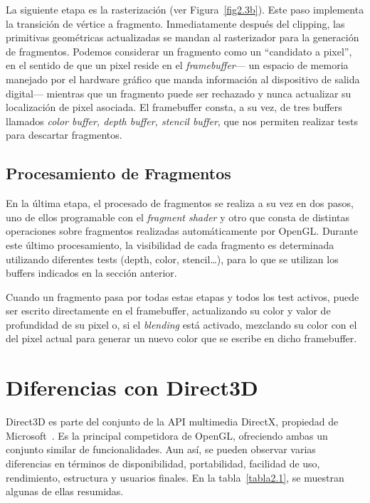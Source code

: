 La siguiente etapa es la rasterización (ver Figura~\ref{fig2.3b}). Este paso
implementa la transición de vértice a fragmento. Inmediatamente después del
clipping, las primitivas geométricas actualizadas se mandan al rasterizador para
la generación de fragmentos. Podemos considerar un fragmento como un ``candidato
a pixel'', en el sentido de que un pixel reside en el \textit{framebuffer}--- un
espacio de memoria manejado por el hardware gráfico que manda información al
dispositivo de salida digital--- mientras que un fragmento puede ser rechazado y
nunca actualizar su localización de pixel asociada. El framebuffer consta, a su
vez, de tres buffers llamados \textit{color buffer, depth buffer, stencil
buffer}, que nos permiten realizar tests para descartar fragmentos.

\subsection{Procesamiento de Fragmentos}
\label{ref:procesamientofrags}

En la última etapa, el procesado de fragmentos se realiza a su vez en dos pasos,
uno de ellos programable con el \textit{fragment shader} y otro que consta de
distintas operaciones sobre fragmentos realizadas automáticamente por OpenGL.
Durante este último procesamiento, la visibilidad de cada fragmento es
determinada utilizando diferentes tests (depth, color, stencil\ldots), para lo
que se utilizan los buffers indicados en la sección anterior. 

Cuando un fragmento pasa por todas estas etapas y todos los test activos, puede
ser escrito directamente en el framebuffer, actualizando su color y valor de
profundidad de su pixel o, si el \textit{blending} está activado, mezclando su
color con el del pixel actual para generar un nuevo color que se escribe en
dicho framebuffer.

\section{Diferencias con Direct3D}
\label{makereference2.4}

Direct3D es parte del conjunto de la API multimedia DirectX, propiedad de
Microsoft~\cite{Microsoft}. Es la principal competidora de OpenGL, ofreciendo
ambas un conjunto similar de funcionalidades. Aun así, se pueden observar varias
diferencias en términos de disponibilidad, portabilidad, facilidad de uso,
rendimiento, estructura y usuarios finales. En la tabla~\ref{tabla2.1}, se
muestran algunas de ellas resumidas.

